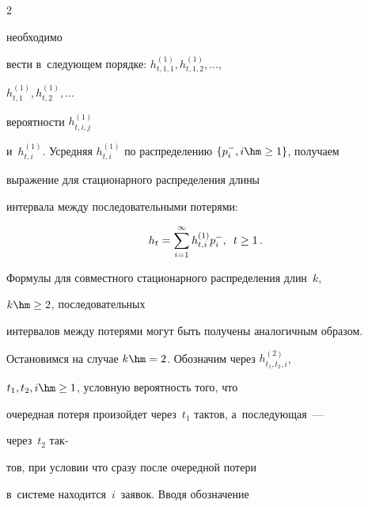 \begin{multicols}{2}
{необходимо


вести в~следующем порядке: $h^{(1)}_{t,1,1}, h^{(1)}_{t,1,2},\dots$,


$h^{(1)}_{t,1},h^{(1)}_{t,2},\dots$} вероятности $h^{(1)}_{t,i,j}$


и~$h^{(1)}_{t,i}$. Усредняя $h^{(1)}_{t,i}$ по распределению $\{ p_i^-, i 


\hm\ge 1\}$, получаем


выражение для стационарного распределения длины


интервала между последовательными потерями:





\noindent


\begin{equation}


\label{loss4}


h_{t}


=\sum\limits_{i=1}^{\infty} h^{(1)}_{t,i} p_i^-, \enskip t \ge 1\,.


\end{equation}





\vspace*{-2pt}





\noindent Формулы для совместного стационарного распределения длин~$k$, 


$k\hm\ge2$, последовательных


интервалов между потерями могут быть получены аналогичным образом. 


Остановимся на случае $k\hm=2$. Обозначим через $h^{(2)}_{t_1,t_2,i}$, 


$t_1,t_2,i \hm\ge 1$, условную вероятность того, что


очередная потеря произойдет через~$t_1$ тактов, а~последующая~--- 


через~$t_2$ так-\linebreak\vspace*{-12pt}





\columnbreak





\noindent


тов, при условии что сразу после очередной потери 


в~сис\-те\-ме находится~$i$~заявок. Вводя обозначение






\end{multicols}
